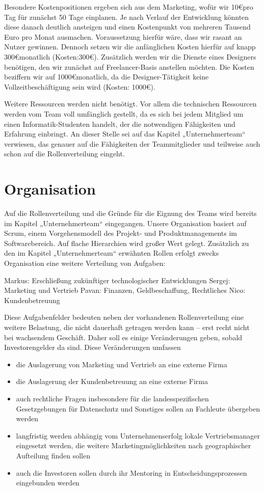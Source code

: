 Besondere Kostenpositionen ergeben sich aus dem Marketing, wofür wir 10\euro pro Tag für zunächst 50 Tage einplanen. Je nach Verlauf der Entwicklung könnten diese danach deutlich ansteigen und einen Kostenpunkt von mehreren Tausend Euro pro Monat ausmachen. Voraussetzung hierfür wäre, dass wir rasant an Nutzer gewinnen. Dennoch setzen wir die anfänglichen Kosten hierfür auf knapp 300\euro monatlich  (Kosten:300\euro).
Zusätzlich werden wir die Dienste eines Designers benötigen, den wir zunächst auf Freelancer-Basis anstellen möchten. Die Kosten beziffern wir auf 1000\euro monatlich, da die Designer-Tätigkeit keine Vollzeitbeschäftigung sein wird (Kosten: 1000\euro).

Weitere Ressourcen werden nicht benötigt. Vor allem die technischen Ressourcen werden vom Team voll umfänglich gestellt, da es sich bei jedem Mitglied um einen Informatik-Studenten handelt, der die notwendigen Fähigkeiten und Erfahrung einbringt. An dieser Stelle sei auf das Kapitel „Unternehmerteam“ verwiesen, das genauer auf die Fähigkeiten der Teammitglieder und teilweise auch schon auf die Rollenverteilung eingeht.


\section{Organisation}
Auf die Rollenverteilung und die Gründe für die Eignung des Teams wird bereits im Kapitel „Unternehmerteam“ eingegangen. Unsere Organisation basiert auf Scrum, einem Vorgehensmodell des Projekt- und Produktmanagements im Softwarebereich. Auf flache Hierarchien wird großer Wert gelegt. Zusätzlich zu den im Kapitel „Unternehmerteam“ erwähnten Rollen erfolgt zwecks Organisation eine weitere Verteilung von Aufgaben:

Markus: Erschließung zukünftiger technologischer Entwicklungen
Sergej: Marketing und Vertrieb
Pavan: Finanzen, Geldbeschaffung, Rechtliches
Nico: Kundenbetreuung

Diese Aufgabenfelder bedeuten neben der vorhandenen Rollenverteilung eine weitere Belastung, die nicht dauerhaft getragen werden kann – erst recht nicht bei wachsendem Geschäft. Daher soll es einige Veränderungen geben, sobald Investorengelder da sind. Diese Veränderungen umfassen

\begin{itemize}
\item die Auslagerung von Marketing und Vertrieb an eine externe Firma
\item die Auslagerung der Kundenbetreuung an eine externe Firma
\item auch rechtliche Fragen insbesondere für die landesspezifischen Gesetzgebungen für Datenschutz und Sonstiges sollen an Fachleute übergeben werden
\item langfristig werden abhängig vom Unternehmenserfolg lokale Vertriebsmanager eingesetzt werden, die weitere Marketingmöglichkeiten nach geographischer Aufteilung finden sollen
\item auch die Investoren sollen durch ihr Mentoring in Entscheidungsprozessen eingebunden werden
\end{itemize}


